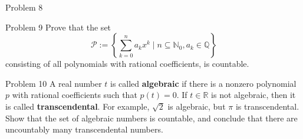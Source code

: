 \documentclass[8pt]{extarticle}
\begin{document}
{\begin{problem}{Problem 8}
  \end{problem}
  \begin{problem}{Problem 9}
    Prove that the set
    \[
      \mathcal{P} := \left\{\sum_{k=0}^{n}a_kx^k \mid n\subseteq \mathbb{N}_0,a_k\in\mathbb{Q}\right\}
    \] 
    consisting of all polynomials with rational coefficients, is countable.
  \end{problem}
  \begin{problem}{Problem 10}
    A real number $t$ is called \textbf{algebraic} if there is a nonzero polynomial $p$ with rational coefficients such that $p(t) = 0$. If $t\in \mathbb{R}$ is not algebraic, then it is called \textbf{transcendental}. For example, $\sqrt{2}$ is algebraic, but $\pi$ is transcendental. Show that the set of algebraic numbers is countable, and conclude that there are uncountably many transcendental numbers.
  \end{problem}
}
\end{document}

